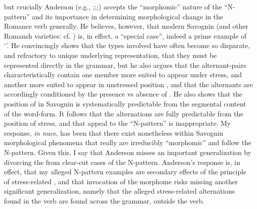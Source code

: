 \documentclass[output=paper,
modfonts
]{LSP/langsci}
\begin{document}
but crucially Anderson (e.g., \citeyear[25]{anderson2010a};\citeyear[34f]{anderson2011a};\citeyear[10,16,23]{anderson2013stem};\citeyear[173]{anderson2016r}) accepts the ``morphomic'' nature of the ``N-pattern'' and its
importance in determining morphological change in the Romance verb
generally. He believes, however, that modern Savognin (and other Romansh
varieties: cf. \citealt{anderson2013stem}) is, in effect, a ``special case'', indeed a
prime example of `'. He
convincingly shows that the  types involved have often become
so disparate, and refractory to unique underlying representation, that
they must be represented directly in the grammar, but he also argues
that the alternant-pairs characteristically contain one member more
suited to appear under stress, and another more suited to appear in
unstressed position \citep[18]{anderson2011a}, and that the alternants are
accordingly conditioned by the presence vs absence of . He also
shows that the position of  in Savognin is systematically
predictable from the segmental content of the word-form. It follows that
the alternations are fully predictable from the position of stress, and
that appeal to the ``N-pattern'' is inappropriate. My response, \emph{in
nuce}, has been that there exist nonetheless within Savognin
morphological phenomena that really are irreducibly ``morphomic'' and
follow the N-pattern. Given this, I say that Anderson misses an
important generalization by divorcing the  from
clear-cut cases of the N-pattern. Anderson's response is, in effect,
that my alleged N-pattern examples are secondary effects of the
principle of stress-related  , and that invocation of
the morphome risks missing another significant generalization, namely
that the alleged stress-related alternations found in the verb are found
across the grammar, outside the verb.
\end{document}
